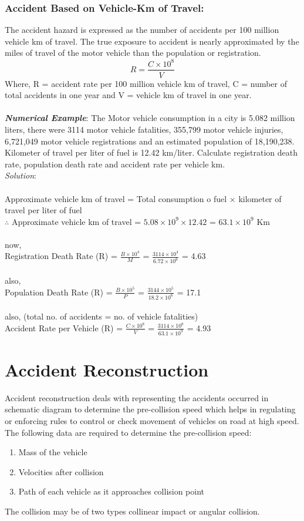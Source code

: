 \subsubsection{Accident Based on Vehicle-Km of Travel:}
The accident hazard is expressed as the number of accidents per 100 million vehicle km of travel. The true exposure to accident is nearly approximated by the miles of travel of the motor vehicle than the population or registration.
\begin{equation}
	R = \frac{C \times 10^8}{V}
\end{equation}
Where, R = accident rate per 100 million vehicle km of travel, C = number of total accidents in one year and V = vehicle km of travel in one year.\\\\
%
\textbf{\textit{Numerical Example}}: The Motor vehicle consumption in a city is 5.082 million liters, there were 3114 motor vehicle fatalities, 355,799 motor vehicle injuries, 6,721,049 motor vehicle registrations and an estimated population of 18,190,238. Kilometer of travel per liter of fuel is 12.42 km/liter. Calculate registration death rate, population death rate and accident rate per vehicle km.\\
\textit{Solution}:\\\\
Approximate vehicle km of travel = Total consumption o fuel $ \times $ kilometer of travel per liter of fuel\\
$ \therefore $ Approximate vehicle km of travel = $ 5.08 \times 10^9 \times 12.42 $ = $ 63.1 \times 10^9 $ Km\\\\
now,\\
Registration Death Rate (R) = $ \frac{B \times 10^4}{M} $ = $ \frac{3114 \times 10^4}{6.72 \times 10^6} $ = 4.63\\\\
also,\\
Population Death Rate (R) = $ \frac{B \times 10^5}{P} $ = $ \frac{3144 \times 10^5}{18.2 \times 10^6} $ = 17.1\\\\
also, (total no. of accidents = no. of vehicle fatalities)\\
Accident Rate per Vehicle (R) = $ \frac{C \times 10^8}{V} $ = $ \frac{3114 \times 10^8}{63.1 \times 10^9} $ = 4.93
\section{Accident Reconstruction}
Accident reconstruction deals with representing the accidents occurred in schematic diagram to determine the pre-collision speed which helps in regulating or enforcing rules to control or check movement of vehicles on road at high speed. The following data are required to determine the pre-collision speed:
\begin{enumerate}
	\item Mass of the vehicle
	\item Velocities after collision
	\item Path of each vehicle as it approaches collision point
\end{enumerate}
The collision may be of two types collinear impact or angular collision.
